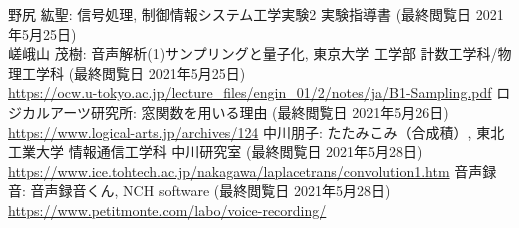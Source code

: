 \documentclass[a4paper,11pt]{jsarticle}
\begin{document}
\begin{thebibliography}{99}
   野尻 紘聖: 信号処理, 制御情報システム工学実験2 実験指導書  (最終閲覧日 2021年5月25日)\\
   嵯峨山 茂樹: 音声解析(1)サンプリングと量子化, 東京大学 工学部 計数工学科/物理工学科 (最終閲覧日 2021年5月25日)\\
  \url{https://ocw.u-tokyo.ac.jp/lecture_files/engin_01/2/notes/ja/B1-Sampling.pdf}
   ロジカルアーツ研究所: 窓関数を用いる理由 (最終閲覧日 2021年5月26日) \\ \url{https://www.logical-arts.jp/archives/124}
   中川朋子: たたみこみ（合成積）, 東北工業大学 情報通信工学科 中川研究室 (最終閲覧日 2021年5月28日) \\ \url{https://www.ice.tohtech.ac.jp/nakagawa/laplacetrans/convolution1.htm}
   音声録音: 音声録音くん, NCH software (最終閲覧日 2021年5月28日) \\ \url{https://www.petitmonte.com/labo/voice-recording/}
\end{thebibliography}
\end{document}
